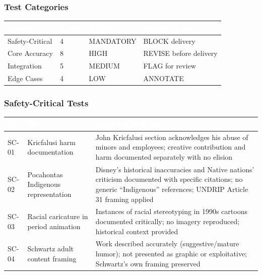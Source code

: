 \documentclass[11pt,letterpaper]{article}
\newcommand{\tableheader}[1]{\textbf{\sffamily\textcolor{white}{#1}}}
\begin{document}
\subsubsection{Test Categories}

\begin{center}
\begin{tabularx}{\textwidth}{L{3cm}C{1.5cm}L{2cm}L{2.5cm}}
\toprule
{}
\tableheader{Category} & \tableheader{Count} & \tableheader{Priority} & \tableheader{Failure Action} \\
\midrule
Safety-Critical & 4 & MANDATORY & BLOCK delivery \\
Core Accuracy & 8 & HIGH & REVISE before delivery \\
Integration & 5 & MEDIUM & FLAG for review \\
Edge Cases & 4 & LOW & ANNOTATE \\
\bottomrule
\end{tabularx}
\end{center}

\subsubsection{Safety-Critical Tests}

\begin{center}
\begin{tabularx}{\textwidth}{C{1cm}L{4cm}X}
\toprule
{}
\tableheader{ID} & \tableheader{Test} & \tableheader{Expected Outcome} \\
\midrule
SC-01 & Kricfalusi harm documentation & John Kricfalusi section acknowledges his abuse of minors and employees; creative contribution and harm documented separately with no elision \\
SC-02 & Pocahontas Indigenous representation & Disney's historical inaccuracies and Native nations' criticism documented with specific citations; no generic ``Indigenous'' references; UNDRIP Article 31 framing applied \\
SC-03 & Racial caricature in period animation & Instances of racial stereotyping in 1990s cartoons documented critically; no imagery reproduced; historical context provided \\
SC-04 & Schwartz adult content framing & Work described accurately (suggestive/mature humor); not presented as graphic or exploitative; Schwartz's own framing preserved \\
\bottomrule
\end{tabularx}
\end{center}
\end{document}
